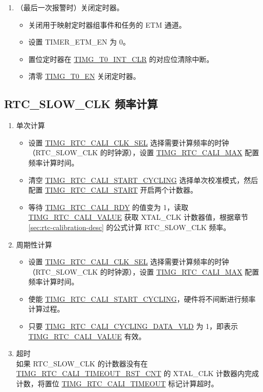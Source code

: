 \documentclass[main\_\_CN.tex]{subfiles}
\begin{document}
\begin{enumerate}
\begin{itemize}
    \end{itemize}
    \item （最后一次报警时）关闭定时器。
    \begin{itemize}
        \item 关闭用于映射定时器组事件和任务的 ETM 通道。
        \item 设置 TIMER\_ETM\_EN 为 0。
        \item 置位定时器在 \hyperref[fielddesc:TIMGT0INTCLR]{TIMG\_T0\_INT\_CLR} 的对应位清除中断。
        \item 清零 \hyperref[fielddesc:TIMGTXEN]{TIMG\_T0\_EN} 关闭定时器。
    \end{itemize}
\end{enumerate}



\subsection{RTC\_SLOW\_CLK 频率计算}\label{sec:rtc-calibration-procedure}
\begin{enumerate}
    \item 单次计算
    \begin{itemize}
        \item 设置 \hyperref[fielddesc:TIMGRTCCALICLKSEL]{TIMG\_RTC\_CALI\_CLK\_SEL} 选择需要计算频率的时钟（RTC\_SLOW\_CLK 的时钟源），设置 \hyperref[fielddesc:TIMGRTCCALIMAX]{TIMG\_RTC\_CALI\_MAX} 配置频率计算时间。
        \item 清空 \hyperref[fielddesc:TIMGRTCCALISTARTCYCLING]{TIMG\_RTC\_CALI\_START\_CYCLING} 选择单次校准模式，然后配置 \hyperref[fielddesc:TIMGRTCCALISTART]{TIMG\_RTC\_CALI\_START} 开启两个计数器。
        \item 等待  \hyperref[fielddesc:TIMGRTCCALIRDY]{TIMG\_RTC\_CALI\_RDY} 的值变为 1，读取 \hyperref[fielddesc:TIMGRTCCALIVALUE]{TIMG\_RTC\_CALI\_VALUE} 获取 XTAL\_CLK 计数器值，根据章节 \ref{sec:rtc-calibration-desc} 的公式计算 RTC\_SLOW\_CLK 频率。
    \end{itemize}
    \item 周期性计算
    \begin{itemize}
        \item 设置 \hyperref[fielddesc:TIMGRTCCALICLKSEL]{TIMG\_RTC\_CALI\_CLK\_SEL} 选择需要计算频率的时钟（RTC\_SLOW\_CLK 的时钟源），设置 \hyperref[fielddesc:TIMGRTCCALIMAX]{TIMG\_RTC\_CALI\_MAX} 配置频率计算时间。
        \item 使能 \hyperref[fielddesc:TIMGRTCCALISTARTCYCLING]{TIMG\_RTC\_CALI\_START\_CYCLING}，硬件将不间断进行频率计算过程。
        \item 只要 \hyperref[fielddesc:TIMGRTCCALICYCLINGDATAVLD]{TIMG\_RTC\_CALI\_CYCLING\_DATA\_VLD} 为 1，即表示 \hyperref[fielddesc:TIMGRTCCALIVALUE]{TIMG\_RTC\_CALI\_VALUE} 有效。
    \end{itemize}
    \item 超时\\
    如果 RTC\_SLOW\_CLK 的计数器没有在 \hyperref[fielddesc:TIMGRTCCALITIMEOUTRSTCNT]{TIMG\_RTC\_CALI\_TIMEOUT\_RST\_CNT} 的 XTAL\_CLK 计数器内完成计数，将置位 \hyperref[fielddesc:TIMGRTCCALITIMEOUT]{TIMG\_RTC\_CALI\_TIMEOUT} 标记计算超时。 
\end{enumerate}
\end{document}
